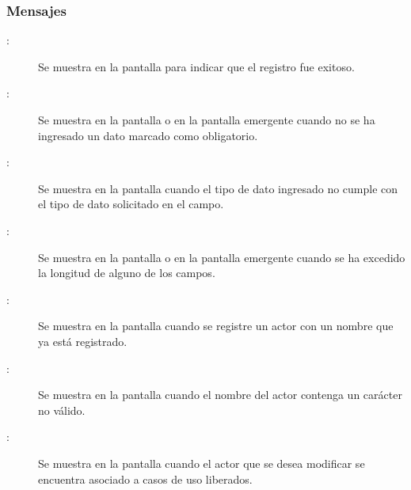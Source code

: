 \subsubsection{Mensajes}
	
\begin{description}
	\item[:] Se muestra en la pantalla  para indicar que el registro fue exitoso.
	\item[:] Se muestra en la pantalla  o en la pantalla emergente  cuando no se ha ingresado un dato marcado como obligatorio.
	\item[:] Se muestra en la pantalla  cuando el tipo de dato ingresado no cumple con el tipo de dato solicitado en el campo.
	\item[:] Se muestra en la pantalla  o en la pantalla emergente  cuando se ha excedido la longitud de alguno de los campos.
	\item[:] Se muestra en la pantalla  cuando se registre un actor con un nombre que ya está registrado.
	\item[:] Se muestra en la pantalla  cuando el nombre del actor contenga un carácter no válido.
	\item[:] Se muestra en la pantalla  cuando el actor que se desea modificar se encuentra asociado a casos de uso liberados.
\end{description}
